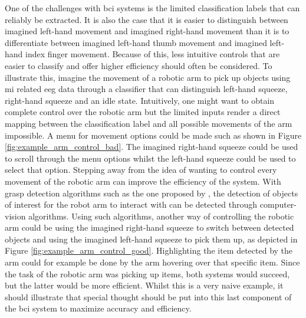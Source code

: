 One of the challenges with \gls{bci} systems is the limited classification labels that can reliably be extracted.
It is also the case that it is easier to distinguish between imagined left-hand movement and imagined right-hand movement than it is to differentiate between imagined left-hand thumb movement and imagined left-hand index finger movement.
Because of this, less intuitive controls that are easier to classify and offer higher efficiency should often be considered.
To illustrate this, imagine the movement of a robotic arm to pick up objects using \gls{mi} related \gls{eeg} data through a classifier that can distinguish left-hand squeeze, right-hand squeeze and an idle state.
Intuitively, one might want to obtain complete control over the robotic arm but the limited inputs render a direct mapping between the classification label and all possible movements of the arm impossible.
A menu for movement options could be made such as shown in Figure \ref{fig:example_arm_control_bad}.
The imagined right-hand squeeze could be used to scroll through the menu options whilst the left-hand squeeze could be used to select that option.
Stepping away from the idea of wanting to control every movement of the robotic arm can improve the efficiency of the system.
With grasp detection algorithms such as the one proposed by \citet{graspnet}, the detection of objects of interest for the robot arm to interact with can be detected through computer-vision algorithms.
Using such algorithms, another way of controlling the robotic arm could be using the imagined right-hand squeeze to switch between detected objects and using the imagined left-hand squeeze to pick them up, as depicted in Figure \ref{fig:example_arm_control_good}.
Highlighting the item detected by the arm could for example be done by the arm hovering over that specific item.
Since the task of the robotic arm was picking up items, both systems would succeed, but the latter would be more efficient.
Whilst this is a very naive example, it should illustrate that special thought should be put into this last component of the \gls{bci} system to maximize accuracy and efficiency.


